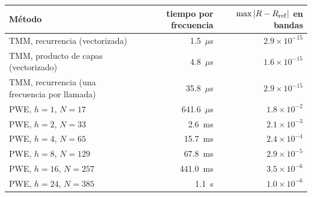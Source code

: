 \begin{tabular}{lrr}
\toprule
Método & tiempo por frecuencia & $\max|R-R_{\rm ref}|$ en bandas \\
\midrule
TMM, recurrencia (vectorizada) & 1.5~$\mu$s & $2.9\times10^{-15}$ \\
TMM, producto de capas (vectorizado) & 4.8~$\mu$s & $1.6\times10^{-15}$ \\
TMM, recurrencia (una frecuencia por llamada) & 35.8~$\mu$s & $2.9\times10^{-15}$ \\
PWE, $h=1$, $N=17$ & 641.6~$\mu$s & $1.8\times10^{-2}$ \\
PWE, $h=2$, $N=33$ & 2.6~ms & $2.1\times10^{-3}$ \\
PWE, $h=4$, $N=65$ & 15.7~ms & $2.4\times10^{-4}$ \\
PWE, $h=8$, $N=129$ & 67.8~ms & $2.9\times10^{-5}$ \\
PWE, $h=16$, $N=257$ & 441.0~ms & $3.5\times10^{-6}$ \\
PWE, $h=24$, $N=385$ & 1.1~s & $1.0\times10^{-6}$ \\
\bottomrule
\end{tabular}
